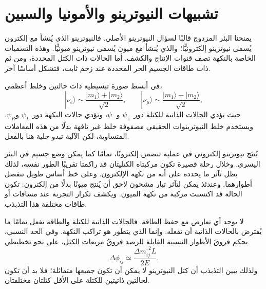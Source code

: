 \section{تشبيهات النيوترينو والأمونيا والسبين}

يمنحنا البئر المزدوج قالبًا لسؤال النيوترينو الأصلي. فالنيوترينو الذي يُنشأ مع إلكترون يُسمى نيوترينو إلكترونيًّا؛ والذي يُنشأ مع ميون يُسمى نيوترينو ميونيًّا. وهذه التسميات الخاصة بالنكهة تصف قنوات الإنتاج والكشف. أما الحالات ذات الكتل المحددة، ومن ثم ذات طاقات الجسيم الحر المحددة عند زخم ثابت، فتشكل أساسًا آخر.

في أبسط صورة تبسيطية ذات حالتين وخلط أعظمي،
\begin{equation}
|\nu_e\rangle \sim \frac{|m_1\rangle+|m_2\rangle}{\sqrt{2}},
\qquad
|\nu_\mu\rangle \sim \frac{|m_1\rangle-|m_2\rangle}{\sqrt{2}},
\end{equation}
حيث تؤدي الحالات الذاتية للكتلة دور \(\psi_+\) و\(\psi_-\)، وتؤدي حالات النكهة دور \(\psi_L\) و\(\psi_R\). ويستخدم خلط النيوترينوات الحقيقي مصفوفة خلط غير تافهة بدلًا من هذه المعاملات المتساوية، لكن الآلية تبدو جلية هنا بالفعل.

يُنتَج نيوترينو إلكتروني في عملية تتضمن إلكترونًا، تمامًا كما يمكن وضع جسيم في البئر اليسرى. وخلال رحلة قصيرة تكون مركبتاه الكتليتان قد راكمتا تقريبًا الطور نفسه، لذلك يظل تآثر ما يحدده على أنه من نكهة الإلكترون. وعلى خط أساس طويل تنفصل أطوارهما. وعندئذ يمكن لتآثر تيار مشحون لاحق أن يُنتج ميونًا بدلًا من إلكترون: تكون الحالة قد اكتسبت مركبة من نكهة الميون. ويكشف تكرار التجربة عند مسافات أو طاقات مختلفة هذا التذبذب.

لا يوجد أي تعارض مع حفظ الطاقة. فالحالات الذاتية للكتلة والطاقة تفعل تمامًا ما يُفترض بالحالات الذاتية أن تفعله. وإنما الذي يتطور هو تراكب النكهة. وفي الحد النسبي، يحكم فروقَ الأطوار النسبية القابلة للرصد فروقُ مربعات الكتل، على نحو تخطيطي
\begin{equation}
\Delta\phi_{ij}\simeq \frac{\Delta m_{ij}^{,2}L}{2E}.
\end{equation}
ولذلك يبين التذبذب أن كتل النيوترينو لا يمكن أن تكون جميعها متماثلة؛ فلا بد أن تكون لحالتين ذاتيتين للكتلة على الأقل كتلتان مختلفتان.

\begin{classroomqa}
\end{classroomqa}

